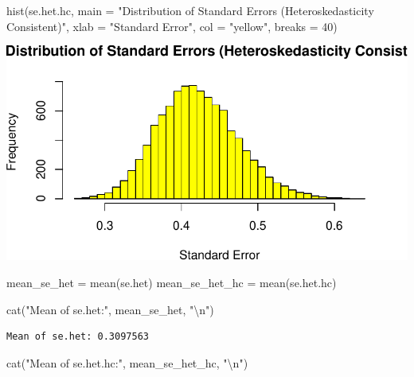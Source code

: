 \documentclass[
  11pt,
]{article}
\newenvironment{Shaded}{\begin{snugshade}}{\end{snugshade}}
\newcommand{\AttributeTok}[1]{\textcolor[rgb]{0.40,0.45,0.13}{#1}}
\newcommand{\DecValTok}[1]{\textcolor[rgb]{0.68,0.00,0.00}{#1}}
\newcommand{\FunctionTok}[1]{\textcolor[rgb]{0.28,0.35,0.67}{#1}}
\newcommand{\NormalTok}[1]{\textcolor[rgb]{0.00,0.23,0.31}{#1}}
\newcommand{\OtherTok}[1]{\textcolor[rgb]{0.00,0.23,0.31}{#1}}
\newcommand{\SpecialCharTok}[1]{\textcolor[rgb]{0.37,0.37,0.37}{#1}}
\newcommand{\StringTok}[1]{\textcolor[rgb]{0.13,0.47,0.30}{#1}}
\begin{document}
\begin{Shaded}
\begin{Highlighting}[]
\FunctionTok{hist}\NormalTok{(se.het.hc, }
     \AttributeTok{main =} \StringTok{"Distribution of Standard Errors (Heteroskedasticity Consistent)"}\NormalTok{, }
     \AttributeTok{xlab =} \StringTok{"Standard Error"}\NormalTok{, }\AttributeTok{col =} \StringTok{"yellow"}\NormalTok{, }\AttributeTok{breaks =} \DecValTok{40}\NormalTok{)}
\end{Highlighting}
\end{Shaded}

\includegraphics{HW-4-CODE-and-ANSWERS_files/figure-pdf/unnamed-chunk-20-2.pdf}

\begin{Shaded}
\begin{Highlighting}[]
\NormalTok{mean\_se\_het }\OtherTok{=} \FunctionTok{mean}\NormalTok{(se.het)}
\NormalTok{mean\_se\_het\_hc }\OtherTok{=} \FunctionTok{mean}\NormalTok{(se.het.hc)}

\FunctionTok{cat}\NormalTok{(}\StringTok{"Mean of se.het:"}\NormalTok{, mean\_se\_het, }\StringTok{"}\SpecialCharTok{\textbackslash{}n}\StringTok{"}\NormalTok{)}
\end{Highlighting}
\end{Shaded}

\begin{verbatim}
Mean of se.het: 0.3097563 
\end{verbatim}

\begin{Shaded}
\begin{Highlighting}[]
\FunctionTok{cat}\NormalTok{(}\StringTok{"Mean of se.het.hc:"}\NormalTok{, mean\_se\_het\_hc, }\StringTok{"}\SpecialCharTok{\textbackslash{}n}\StringTok{"}\NormalTok{)}
\end{Highlighting}
\end{Shaded}
\end{document}
